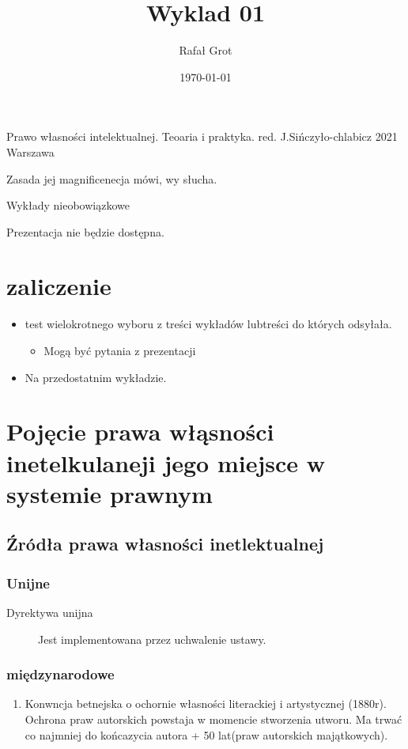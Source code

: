 \documentclass[11pt]{article}
\author{Rafał Grot}
\date{\today}
\title{Wyklad 01}
\begin{document}
\maketitle
\tableofcontents

\begin{description}
\item[{Podręcznik}] Prawo własności intelektualnej. Teoaria i praktyka. red. J.Sińczyło-chlabicz 2021 Warszawa
\item[{Pytania na koniec}] Zasada jej magnificenecja mówi, wy słucha.
\item Wykłady nieobowiązkowe
\item Prezentacja nie będzie dostępna.
\end{description}
\section{zaliczenie}
\label{sec:org00a605f}
\begin{itemize}
\item test wielokrotnego wyboru z treści wykładów lubtreści do których odsyłała.
\begin{itemize}
\item Mogą być pytania z prezentacji
\end{itemize}
\item Na przedostatnim wykładzie.
\end{itemize}
\section{Pojęcie prawa włąsności inetelkulaneji jego miejsce w systemie prawnym}
\label{sec:org3f233aa}
\subsection{Źródła prawa własności inetlektualnej}
\label{sec:org491439d}
\subsubsection{Unijne}
\label{sec:orgb13b66c}
\begin{description}
\item[{Dyrektywa unijna}] Jest implementowana przez uchwalenie ustawy.
\end{description}
\subsubsection{międzynarodowe}
\label{sec:orgca2c054}
\begin{enumerate}
\item Konwncja betnejska o ochornie własności literackiej i artystycznej (1880r).
\label{sec:orgcdd6dcf}
Ochrona praw autorskich powstaja w momencie stworzenia utworu. Ma trwać co najmniej do końcazycia autora + 50 lat(praw autorskich majątkowych).
\end{enumerate}
\end{document}
